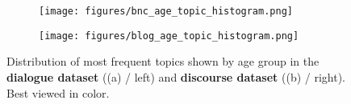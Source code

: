 \begin{figure}[H]
     \centering
     \begin{subfigure}[b]{0.45\textwidth}
        \centering
        \texttt{[image: figures/bnc\_age\_topic\_histogram.png]}
        \caption{}
        \label{fig:bnc_age_topic_dist_incl_unk}
     \end{subfigure}
     \hfill
     \begin{subfigure}[b]{0.45\textwidth}
        \centering
        \texttt{[image: figures/blog\_age\_topic\_histogram.png]}
        \caption{}
        \label{fig:blog_age_topic_dist_incl_unk}
     \end{subfigure}
        \caption{Distribution of most frequent topics shown by age group in the \textbf{dialogue dataset} ((a) / left) and \textbf{discourse dataset} ((b) / right). Best viewed in color.}
        \label{fig:bnc_blog_age_topic_dist_incl_unk}
\end{figure}






